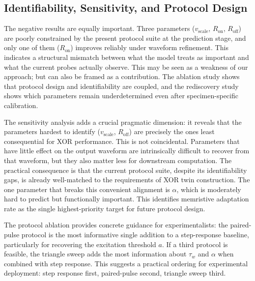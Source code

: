 \documentclass[letterpaper]{article}
\begin{document}
\subsection{Identifiability, Sensitivity, and Protocol Design}
The negative results are equally important. Three parameters ($v_{\text{scale}}$, $R_{\mathrm{on}}$, $R_{\mathrm{off}}$) are poorly constrained by the present protocol suite at the prediction stage, and only one of them ($R_{\mathrm{on}}$) improves reliably under waveform refinement. This indicates a structural mismatch between what the model treats as important and what the current probes actually observe. This may be seen as a weakness of our approach; but can also be framed as a contribution. The ablation study shows that protocol design and identifiability are coupled, and the rediscovery study shows which parameters remain underdetermined even after specimen-specific calibration.

The sensitivity analysis adds a crucial pragmatic dimension: it reveals that the parameters hardest to identify ($v_{\text{scale}}$, $R_{\mathrm{off}}$) are precisely the ones least consequential for XOR performance. This is not coincidental. Parameters that have little effect on the output waveform are intrinsically difficult to recover from that waveform, but they also matter less for downstream computation. The practical consequence is that the current protocol suite, despite its identifiability gaps, is already well-matched to the requirements of XOR twin construction. The one parameter that breaks this convenient alignment is $\alpha$, which is moderately hard to predict but functionally important. This identifies memristive adaptation rate as the single highest-priority target for future protocol design.

The protocol ablation provides concrete guidance for experimentalists: the paired-pulse protocol is the most informative single addition to a step-response baseline, particularly for recovering the excitation threshold $a$. If a third protocol is feasible, the triangle sweep adds the most information about $\tau_w$ and $\alpha$ when combined with step response. This suggests a practical ordering for experimental deployment: step response first, paired-pulse second, triangle sweep third.
\end{document}
